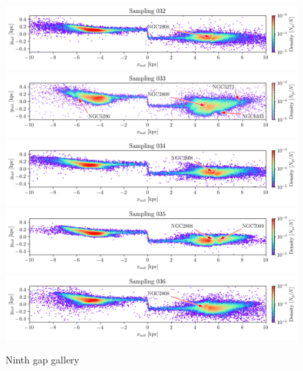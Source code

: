 \documentclass[draft]{aa}
\begin{document}
\begin{appendix}
    \begin{figure}
      \centering
      \includegraphics[width=\linewidth]{gallery_of_gaps_monte-carlo-032.png}
      \includegraphics[width=\linewidth]{gallery_of_gaps_monte-carlo-033.png}
      \includegraphics[width=\linewidth]{gallery_of_gaps_monte-carlo-034.png}      
      \includegraphics[width=\linewidth]{gallery_of_gaps_monte-carlo-035.png}
      \includegraphics[width=\linewidth]{gallery_of_gaps_monte-carlo-036.png}      
      \caption{Ninth gap gallery}
      \label{fig:gallery8}
      \end{figure}    




\end{appendix}
\end{document}
